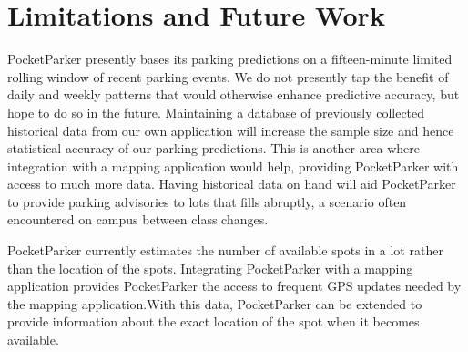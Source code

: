 \section{Limitations and Future Work}
\label{sec-future}
\begin{comment}
The pocketsourcing approach taken by PocketParker makes it easy to integrate
into existing mapping applications, such as Google Maps. Doing so would
benefit PocketParker in two ways. First, Google Maps and other navigation
tools are in extremely wide deployment, with the Play Store estimating
more than 500 millions of installs for Google Maps. If we can increase the monitored
fraction significantly, much of the work PocketParker does to perform
estimation and work around low monitored fractions will be unnecessary.
  Removed this paragraph to save space
PocketParker will also benefit from the increased amount of location context
available through integration into mapping software. We imagine a ``Help Me
Park'' button which engages PocketParker. This small piece of natural user
input allows PocketParker to identify \textit{explicit} searches and use them
to build up a lot desirability model with requiring annotations. However,
once PocketParker begins guiding users to available parking spaces we will
have to incorporate the effects of our guidance on natural user behavior.
However, we believe that many users will only query PocketParker when parking
in unfamiliar locations, while still providing data about lots they use
regularly and know well.
\end{comment}

PocketParker presently bases its parking predictions on a fifteen-minute
limited rolling window of recent parking events. We do not presently tap the
benefit of daily and weekly patterns that would otherwise enhance predictive
accuracy, but hope to do so in the future. Maintaining a database of
previously collected historical data from our own application will increase
the sample size and hence statistical accuracy of our parking predictions.
This is another area where integration with a mapping application would help,
providing PocketParker with access to much more data. Having historical data on
hand will aid PocketParker to provide parking advisories to lots that fills 
abruptly, a scenario often encountered on campus between class changes.

PocketParker currently estimates the number of available spots in a lot rather
than the location of the spots. Integrating PocketParker with a mapping
application provides PocketParker the access to frequent GPS updates needed by
the mapping application.With this
data, PocketParker can be extended to provide information about the exact
location of the spot when it becomes available.

